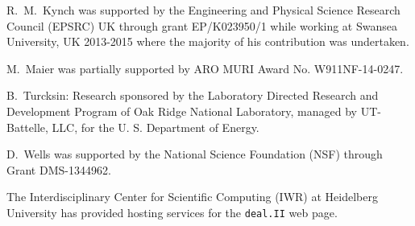 \documentclass{ansarticle-preprint}
\newcommand{\specialword}[1]{\texttt{#1}}
\newcommand{\dealii}{{\specialword{deal.II}}\xspace}
\begin{document}
R.~M.~Kynch was supported by the Engineering and Physical Science Research
Council (EPSRC) UK through grant EP/K023950/1 while working at Swansea
University, UK 2013-2015 where the majority of his contribution was
undertaken.

M.~Maier was partially supported by ARO MURI Award No. W911NF-14-0247.

B.~Turcksin: Research sponsored by the Laboratory Directed Research and
Development Program of Oak Ridge National Laboratory, managed by UT-Battelle,
LLC, for the U. S. Department of Energy.

D.~Wells was supported by the National Science Foundation (NSF) through Grant
DMS-1344962.

The Interdisciplinary Center for Scientific Computing (IWR) at Heidelberg
University has provided hosting services for the \dealii web page.


{}

\end{document}
